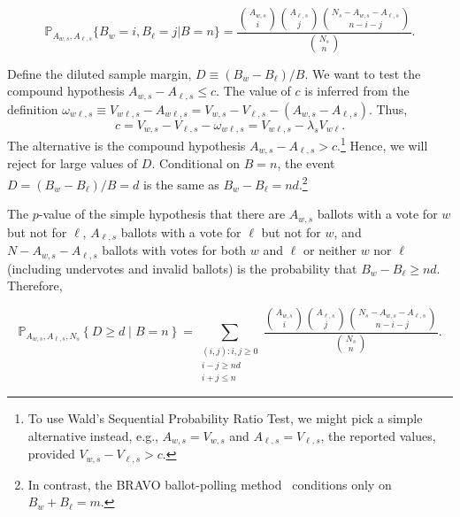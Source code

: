 \begin{equation}
    \mathbb{P}_{A_{w,s}, A_{\ell,s}} \{ B_w = i, B_\ell = j \vert B=n \} = 
     \frac{ {A_{w,s } \choose i}{A_{\ell,s} \choose j}{N_s - A_{w,s} - A_{\ell,s} \choose n-i-j}}{{N_s \choose n}}.
\end{equation}

Define the diluted sample margin, $D \equiv (B_w - B_\ell)/B$.
We want to test the compound hypothesis $A_{w,s} - A_{\ell,s} \le c$.
The value of $c$ is inferred from the definition
$\omega_{w\ell,s} \equiv V_{w\ell,s} - A_{w\ell,s} = V_{w,s} - V_{\ell,s} - (A_{w,s} -A_{\ell,s})$.
Thus,
$$
    c = V_{w,s} - V_{\ell,s} - \omega_{w\ell,s} = V_{w\ell,s} - \lambda_s V_{w\ell}.
$$
The alternative is the compound hypothesis 
$A_{w,s} - A_{\ell,s} > c$.\footnote{%
    To use Wald's Sequential Probability Ratio Test, we might pick a simple alternative instead, e.g.,
   $A_{w,s} = V_{w,s}$ and $A_{\ell,s} = V_{\ell,s}$, the reported values, provided 
   $V_{w,s} - V_{\ell,s} > c$.
}
Hence, we will reject for large values of $D$.
Conditional on $B=n$, the event $D = (B_w - B_\ell)/B = d$ is the same as $B_w - B_\ell = nd$.\footnote{%
In contrast, the BRAVO ballot-polling
method~\cite{lindemanEtal12}
conditions only on $B_w+B_\ell = m$.
}


The $p$-value of the simple hypothesis that there are $A_{w,s}$ ballots with
a vote for $w$ but not for $\ell$, $A_{\ell,s}$ ballots with a vote for $\ell$ but not for $w$, 
and $N - A_{w,s} - A_{\ell,s}$ ballots with votes for both $w$ and $\ell$ or neither $w$ nor $\ell$ 
(including undervotes and
invalid ballots) is the probability that $B_w - B_\ell \geq nd$.
Therefore,

\begin{equation}
   \mathbb{P}_{A_{w,s}, A_{\ell,s}, N_s} \left \{ D \geq d \;\vert\; B = n\right \} = 
   \sum_{\substack{(i, j) :  i, j\ge 0 \\ i-j \geq nd \\ i+j \leq n}} \frac{ {A_{w,s } \choose i}{A_{\ell,s} \choose j}{N_s - A_{w,s} - A_{\ell,s} \choose n-i-j}}{{N_s \choose n}}.
\end{equation}


